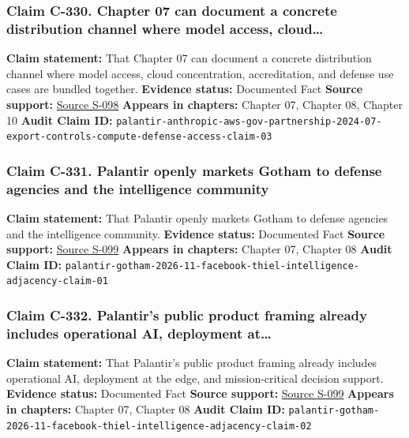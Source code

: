 \documentclass[
  american,
  11pt,
  letterpaper,
]{article}
\begin{document}
\subsubsection{Claim C-330. Chapter 07 can document a concrete
distribution channel where model access,
cloud\ldots{}}\label{claim-c-330-chapter-07-can-document-a-concrete-distribution-channel-where-model-access-cloud}

\textbf{Claim statement:} That Chapter 07 can document a concrete
distribution channel where model access, cloud concentration,
accreditation, and defense use cases are bundled together.
\textbf{Evidence status:} Documented Fact \textbf{Source support:}
\hyperref[source-s-098-anthropic-and-palantir-partner-to-bring-claude-ai-models-to-aws-for-u-s-government-intelligence-and-defense-operations]{Source
S-098} \textbf{Appears in chapters:} Chapter 07, Chapter 08, Chapter 10
\textbf{Audit Claim ID:}
\texttt{palantir-anthropic-aws-gov-partnership-2024-07-export-controls-compute-defense-access-claim-03}

\subsubsection{Claim C-331. Palantir openly markets Gotham to defense
agencies and the intelligence
community}\label{claim-c-331-palantir-openly-markets-gotham-to-defense-agencies-and-the-intelligence-community}

\textbf{Claim statement:} That Palantir openly markets Gotham to defense
agencies and the intelligence community. \textbf{Evidence status:}
Documented Fact \textbf{Source support:}
\hyperref[source-s-099-gotham]{Source S-099} \textbf{Appears in
chapters:} Chapter 07, Chapter 08 \textbf{Audit Claim ID:}
\texttt{palantir-gotham-2026-11-facebook-thiel-intelligence-adjacency-claim-01}

\subsubsection{Claim C-332. Palantir's public product framing already
includes operational AI, deployment
at\ldots{}}\label{claim-c-332-palantir-s-public-product-framing-already-includes-operational-ai-deployment-at}

\textbf{Claim statement:} That Palantir's public product framing already
includes operational AI, deployment at the edge, and mission-critical
decision support. \textbf{Evidence status:} Documented Fact
\textbf{Source support:} \hyperref[source-s-099-gotham]{Source S-099}
\textbf{Appears in chapters:} Chapter 07, Chapter 08 \textbf{Audit Claim
ID:}
\texttt{palantir-gotham-2026-11-facebook-thiel-intelligence-adjacency-claim-02}
\end{document}
